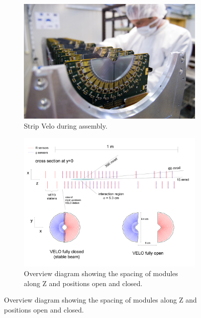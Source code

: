 \begin{figure}[H]
  \centering
\begin{subfigure}[t]{0.4\textwidth}
  \centering
  \includegraphics[width=\linewidth]{figures/chapter2/velo_assembly.jpg}
  \caption{Strip Velo during assembly\footnotemark. }
  \label{fig:velo_assembly}
  \end{subfigure}
\begin{subfigure}[t]{0.5\textwidth}
  \centering
  \includegraphics[width=\linewidth]{figures/chapter2/veloOverview.png}
  \caption[overview]{Overview diagram showing the spacing of modules along Z and positions open and closed.}
  \label{fig:velo_overview}
  \end{subfigure}
\end{figure}



